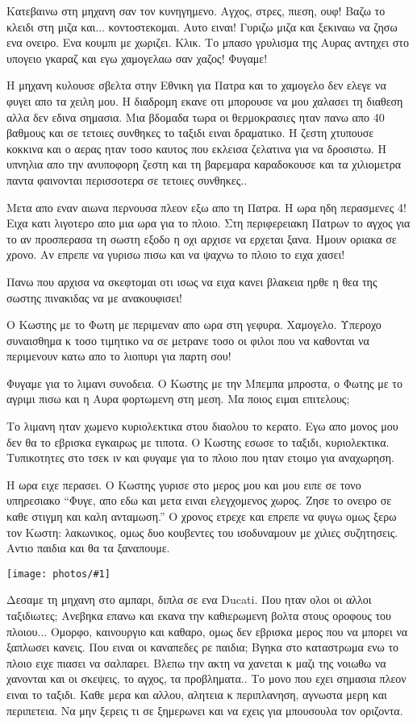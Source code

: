 \documentclass[]{book}
\newcommand\photo[1]{\noindent\texttt{[image: photos/\#1]}}
\begin{document}
Κατεβαινω στη μηχανη σαν τον κυνηγημενο. Αγχος, στρες, πιεση, ουφ! Βαζω το κλειδι στη μιζα και... κοντοστεκομαι. Αυτο ειναι! Γυριζω μιζα και ξεκιναω να ζησω ενα ονειρο. Ενα κουμπι με χωριζει. Κλικ. Το μπασο γρυλισμα της Αυρας αντηχει στο υπογειο γκαραζ και εγω χαμογελαω σαν χαζος! Φυγαμε!

Η μηχανη κυλουσε σβελτα στην Εθνικη για Πατρα και το χαμογελο δεν ελεγε να φυγει απο τα χειλη μου. Η διαδρομη εκανε οτι μπορουσε να μου χαλασει τη διαθεση αλλα δεν εδινα σημασια. Μια βδομαδα τωρα οι θερμοκρασιες ηταν πανω απο 40 βαθμους και σε τετοιες συνθηκες το ταξιδι ειναι δραματικο. Η ζεστη χτυπουσε κοκκινα και ο αερας ηταν τοσο καυτος που εκλεισα ζελατινα για να δροσιστω.  Η υπνηλια απο την ανυποφορη ζεστη και τη βαρεμαρα καραδοκουσε και τα χιλιομετρα παντα φαινονται περισσοτερα σε τετοιες συνθηκες..

Μετα απο εναν αιωνα περνουσα πλεον εξω απο τη Πατρα. Η ωρα ηδη περασμενες 4! Ειχα κατι λιγοτερο απο μια ωρα για το πλοιο.  Στη περιφερειακη Πατρων το αγχος για το αν προσπερασα τη σωστη εξοδο η οχι αρχισε να ερχεται ξανα. Ημουν οριακα σε χρονο. Αν επρεπε να γυρισω πισω και να ψαχνω το πλοιο το ειχα χασει!

Πανω που αρχισα να σκεφτομαι οτι ισως να ειχα κανει βλακεια ηρθε η θεα της σωστης πινακιδας να με ανακουφισει!

Ο Κωστης με το Φωτη με περιμεναν απο ωρα στη γεφυρα. Χαμογελο. Υπεροχο συναισθημα κ τοσο τιμητικο να σε μετρανε τοσο οι φιλοι που να καθονται να περιμενουν κατω απο το λιοπυρι για παρτη σου! 

Φυγαμε για το λιμανι συνοδεια. Ο Κωστης με την Μπεμπα μπροστα, ο Φωτης με το αγριμι πισω και η Αυρα φορτωμενη στη μεση. Μα ποιος ειμαι επιτελους; 

Το λιμανη ηταν χωμενο κυριολεκτικα στου διαολου το κερατο. Εγω απο μονος μου δεν θα το εβρισκα εγκαιρως με τιποτα. Ο Κωστης εσωσε το ταξιδι, κυριολεκτικα. Τυπικοτητες στο τσεκ ιν και φυγαμε για το πλοιο που ηταν ετοιμο για αναχωρηση.

Η ωρα ειχε περασει. Ο Κωστης γυρισε στο μερος μου και μου ειπε σε τονο υπηρεσιακο ``Φυγε, απο εδω και μετα ειναι ελεγχομενος χωρος. Ζησε το ονειρο σε καθε στιγμη και καλη ανταμωση.'' Ο χρονος ετρεχε και επρεπε να φυγω ομως ξερω τον Κωστη: λακωνικος, ομως δυο κουβεντες του ισοδυναμουν με χιλιες συζητησεις. Αντιο παιδια και θα τα ξαναπουμε.

\photo{3.jpg}

Δεσαμε τη μηχανη στο αμπαρι, διπλα σε ενα Ducati. Που ηταν ολοι οι αλλοι ταξιδιωτες; Ανεβηκα επανω και εκανα την καθιερωμενη βολτα στους οροφους του πλοιου...  Ομορφο, καινουργιο και καθαρο, ομως δεν εβρισκα μερος που να μπορει να ξαπλωσει κανεις. Που ειναι οι καναπεδες ρε παιδια; Βγηκα στο καταστρωμα ενω το πλοιο ειχε πιασει να σαλπαρει. Βλεπω την ακτη να χανεται κ μαζι της νοιωθω να χανονται και οι σκεψεις, το αγχος, τα προβληματα.. Το μονο που εχει σημασια πλεον ειναι το ταξιδι. Καθε μερα και αλλου, αλητεια κ περιπλανηση, αγνωστα μερη και περιπετεια. Να μην ξερεις τι σε ξημερωνει και να εχεις για μπουσουλα τον οριζοντα.
\end{document}
